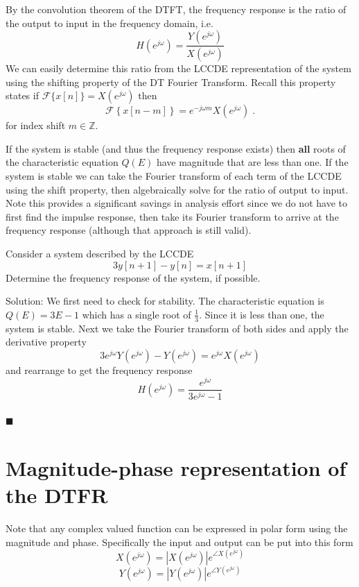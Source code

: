 By the convolution theorem of the DTFT, the frequency response is the ratio of the output to input in the frequency domain, i.e.
\[
H\left(e^{j\omega}\right) = \frac{Y\left(e^{j\omega}\right)}{X\left(e^{j\omega}\right)}
\]
We can easily determine this ratio from the LCCDE representation of the system using the shifting property of the DT Fourier Transform. Recall this property states if $\mathcal{F}\{x[n]\} = X\left(e^{j\omega}\right)$ then
\[
\mathcal{F}\left\{x[n-m] \right\} =  e^{-j\omega m} X\left(e^{j\omega}\right)\; .
\]
for index shift $m\in\mathbb{Z}$.

If the system is stable (and thus the frequency response exists) then \textbf{all} roots of the characteristic equation $Q(E)$ have magnitude that are less than one. If the system is stable we can take the Fourier transform of each term of the LCCDE using the shift property, then algebraically solve for the ratio of output to input. Note this provides a significant savings in analysis effort since we do not have to first find the impulse response, then take its Fourier transform to arrive at the frequency response (although that approach is still valid).

\begin{example} Consider a system described by the LCCDE
  \[
  3y[n+1]-y[n] = x[n+1]
  \]
  Determine the frequency response of the system, if possible.

  Solution: We first need to check for stability. The characteristic equation is $Q(E) = 3E - 1$ which has a single root of $\frac{1}{3}$. Since it is less than one, the system is stable. Next we take the Fourier transform of both sides and apply the derivative property
  \[
  3e^{j\omega} Y\left(e^{j\omega}\right) - Y\left(e^{j\omega}\right) = e^{j\omega} X\left(e^{j\omega}\right)
  \]
  and rearrange to get the frequency response
  \[
  H\left(e^{j\omega}\right) = \frac{e^{j\omega}}{3e^{j\omega}-1}
  \]\\
  $\blacksquare$
\end{example}

\section{Magnitude-phase representation of the DTFR}

Note that any complex valued function can be expressed in polar form using the magnitude and phase. Specifically the input and output can be put into this form
\[
X\left(e^{j\omega}\right) = |X\left(e^{j\omega}\right)|e^{\angle X\left(e^{j\omega}\right)}
\]
\[
Y\left(e^{j\omega}\right) = |Y\left(e^{j\omega}\right)|e^{\angle Y\left(e^{j\omega}\right)}
\]


